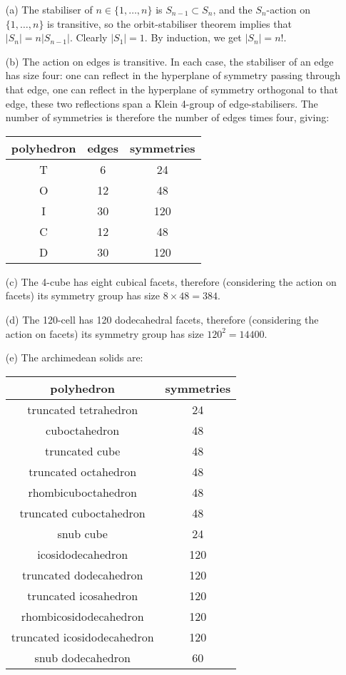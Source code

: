 \documentclass[12pt]{article}
\begin{document}
\begin{answer}
  \begin{enumerate}
  \item[(a)] The stabiliser of $n\in\{1,\ldots,n\}$ is $S_{n-1}\subset S_n$, and the $S_n$-action on $\{1,\ldots,n\}$ is transitive, so the orbit-stabiliser theorem implies that $|S_n|=n|S_{n-1}|$. Clearly $|S_1|=1$. By induction, we get $|S_n|=n!$.
  \item[(b)] The action on edges is transitive. In each case, the stabiliser of an edge has size four: one can reflect in the hyperplane of symmetry passing through that edge, one can reflect in the hyperplane of symmetry orthogonal to that edge, these two reflections span a Klein 4-group of edge-stabilisers. The number of symmetries is therefore the number of edges times four, giving:

    \begin{tabular}{c|cc}
      polyhedron & edges & symmetries\\
      \hline
      T & 6 & 24\\
      O & 12 & 48\\
      I & 30 & 120\\
      C & 12 & 48\\
      D & 30 & 120
    \end{tabular}
    
  \item[(c)] The 4-cube has eight cubical facets, therefore (considering the action on facets) its symmetry group has size $8\times 48=384$.
  \item[(d)] The 120-cell has 120 dodecahedral facets, therefore (considering the action on facets) its symmetry group has size $120^2=14400$.
  \item[(e)] The archimedean solids are:

    \begin{tabular}{c|c}
      polyhedron & symmetries\\
      \hline
      truncated tetrahedron & 24\\
      cuboctahedron & 48\\
      truncated cube & 48\\
      truncated octahedron & 48\\
      rhombicuboctahedron & 48\\
      truncated cuboctahedron & 48\\
      snub cube & 24\\
      icosidodecahedron & 120\\
      truncated dodecahedron & 120\\
      truncated icosahedron & 120\\
      rhombicosidodecahedron & 120\\
      truncated icosidodecahedron & 120\\
      snub dodecahedron & 60
    \end{tabular}
    

\end{enumerate}
\end{answer}
\end{document}
